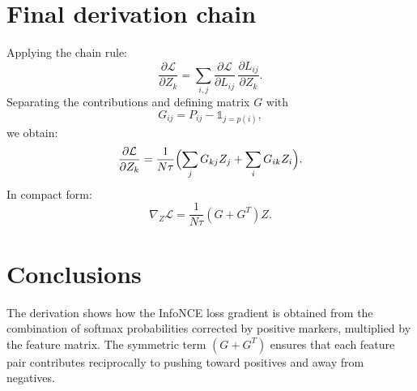 \documentclass[a4paper,11pt]{article}
\begin{document}
\section{Final derivation chain}
Applying the chain rule:
\[
\frac{\partial \mathcal{L}}{\partial Z_k} = \sum_{i,j} \frac{\partial \mathcal{L}}{\partial L_{ij}} \, \frac{\partial L_{ij}}{\partial Z_k}.
\]
Separating the contributions and defining matrix $G$ with
\[
G_{ij} = P_{ij} - \mathbb{1}_{j=p(i)},
\]
we obtain:
\[
\frac{\partial \mathcal{L}}{\partial Z_k} = \frac{1}{N \tau} \Bigl(\sum_{j} G_{kj} Z_j + \sum_{i} G_{ik} Z_i\Bigr).
\]
In compact form:
\[
\nabla_Z \mathcal{L} = \frac{1}{N \tau} (G + G^T) Z.
\]

\section*{Conclusions}
The derivation shows how the InfoNCE loss gradient is obtained from the combination of softmax probabilities corrected by positive markers, multiplied by the feature matrix. The symmetric term $(G+G^T)$ ensures that each feature pair contributes reciprocally to pushing toward positives and away from negatives.
\end{document}
